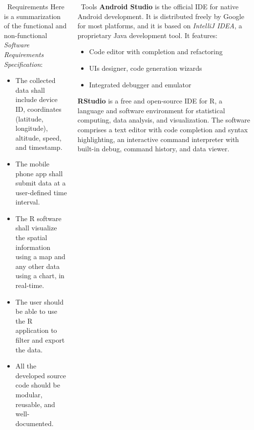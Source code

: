 \documentclass[final]{beamer}
\newlength{\onecolwid}
\newlength{\twocolwid}
\begin{document}
\begin{frame}[t]
\begin{columns}[t]
\begin{column}{\onecolwid}
	\begin{block}{\faListUl \, Requirements}
		Here is a summarization of the functional and non-functional \emph{Software Requirements Specification}:
		\begin{itemize}
			\item The collected data shall include device ID, coordinates (latitude, longitude), altitude, speed, and timestamp.
			\item The mobile phone app shall submit data at a user-defined time interval.
			\item The R software shall visualize the spatial information using a map and any other data using a chart, in real-time.
			\item The user should be able to use the R application to filter and export the data.
			\item All the developed source code should be modular, reusable, and well-documented.
		\end{itemize}
	\end{block}
\end{column}

\begin{column}{\twocolwid}
	\begin{columns}[t, totalwidth=\twocolwid]
		\begin{column}{\onecolwid}\vspace{-.5in}
			\begin{block}{\faWrench \, Tools}
				\textbf{Android Studio} is the official IDE for native Android development.
				It is distributed freely by Google for most platforms, and it is based on \emph{IntelliJ IDEA}, a proprietary Java development tool.
				It features:
				\begin{itemize}
					\item Code editor with completion and refactoring
					\item UIs designer, code generation wizards
					\item Integrated debugger and emulator
				\end{itemize}

				\vspace{.3in}
				\textbf{RStudio} is a free and open-source IDE for R, a language and software environment for statistical computing, data analysis, and visualization. The software comprises a text editor with code completion and syntax highlighting, an interactive command interpreter with built-in debug, command history, and data viewer.


\end{block}
\end{column}
\end{columns}
\end{column}
\end{columns}
\end{frame}
\end{document}
